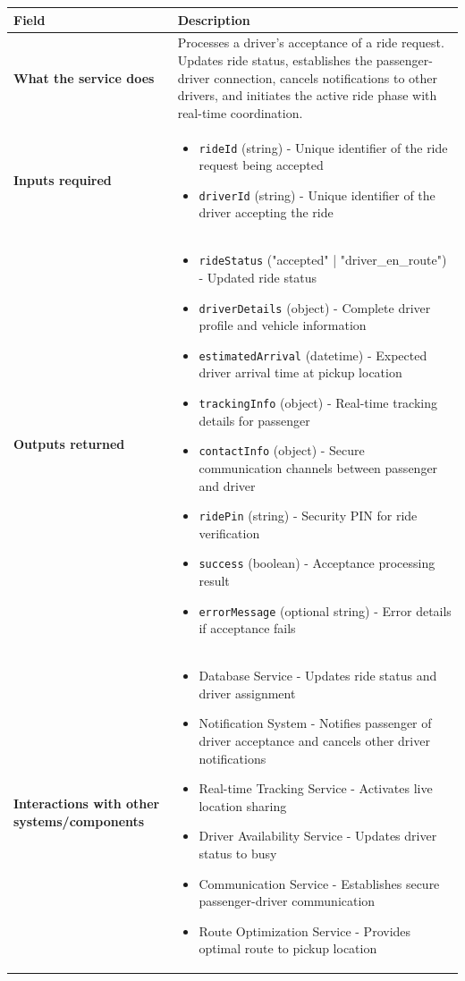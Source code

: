 \documentclass[11pt,a4paper]{article}
\begin{document}
\begin{longtable}{|p{3cm}|p{12cm}|}
\hline
\textbf{Field} & \textbf{Description} \\
\hline
\textbf{What the service does} & 
Processes a driver's acceptance of a ride request. Updates ride status, establishes the passenger-driver connection, cancels notifications to other drivers, and initiates the active ride phase with real-time coordination. \\
\hline
\textbf{Inputs required} & 
\begin{itemize}[nosep]
\item \texttt{rideId} (string) - Unique identifier of the ride request being accepted
\item \texttt{driverId} (string) - Unique identifier of the driver accepting the ride
\end{itemize} \\
\hline
\textbf{Outputs returned} & 
\begin{itemize}[nosep]
\item \texttt{rideStatus} ("accepted" | "driver\_en\_route") - Updated ride status
\item \texttt{driverDetails} (object) - Complete driver profile and vehicle information
\item \texttt{estimatedArrival} (datetime) - Expected driver arrival time at pickup location
\item \texttt{trackingInfo} (object) - Real-time tracking details for passenger
\item \texttt{contactInfo} (object) - Secure communication channels between passenger and driver
\item \texttt{ridePin} (string) - Security PIN for ride verification
\item \texttt{success} (boolean) - Acceptance processing result
\item \texttt{errorMessage} (optional string) - Error details if acceptance fails
\end{itemize} \\
\hline
\textbf{Interactions with other systems/components} & 
\begin{itemize}[nosep]
\item Database Service - Updates ride status and driver assignment
\item Notification System - Notifies passenger of driver acceptance and cancels other driver notifications
\item Real-time Tracking Service - Activates live location sharing
\item Driver Availability Service - Updates driver status to busy
\item Communication Service - Establishes secure passenger-driver communication
\item Route Optimization Service - Provides optimal route to pickup location
\end{itemize} \\
\hline
\end{longtable}
\end{document}

